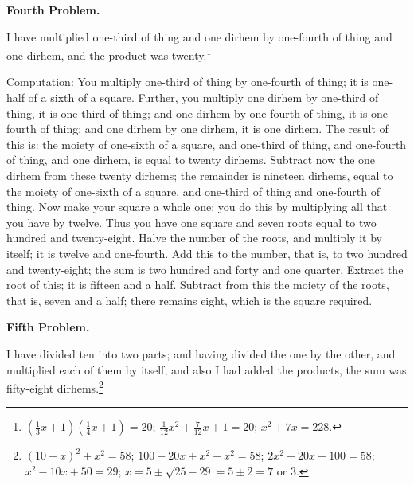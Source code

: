 \vspace{0.3cm}
\noindent\textbf{Fourth Problem.}

I have multiplied one-third of thing and one dirhem by one-fourth of thing and one dirhem, and the product was twenty.\footnote{$(\frac{1}{3}x + 1)(\frac{1}{4}x + 1) = 20$; $\frac{1}{12}x^2 + \frac{7}{12}x + 1 = 20$; $x^2 + 7x = 228$.}

Computation: You multiply one-third of thing by one-fourth of thing; it is one-half of a sixth of a square. Further, you multiply one dirhem by one-third of thing, it is one-third of thing; and one dirhem by one-fourth of thing, it is one-fourth of thing; and one dirhem by one dirhem, it is one dirhem. The result of this is: the moiety of one-sixth of a square, and one-third of thing, and one-fourth of thing, and one dirhem, is equal to twenty dirhems. Subtract now the one dirhem from these twenty dirhems; the remainder is nineteen dirhems, equal to the moiety of one-sixth of a square, and one-third of thing and one-fourth of thing. Now make your square a whole one: you do this by multiplying all that you have by twelve. Thus you have one square and seven roots equal to two hundred and twenty-eight. Halve the number of the roots, and multiply it by itself; it is twelve and one-fourth. Add this to the number, that is, to two hundred and twenty-eight; the sum is two hundred and forty and one quarter. Extract the root of this; it is fifteen and a half. Subtract from this the moiety of the roots, that is, seven and a half; there remains eight, which is the square required.

\vspace{0.3cm}
\noindent\textbf{Fifth Problem.}

I have divided ten into two parts; and having divided the one by the other, and multiplied each of them by itself, and also I had added the products, the sum was fifty-eight dirhems.\footnote{$(10-x)^2 + x^2 = 58$; $100 - 20x + x^2 + x^2 = 58$; $2x^2 - 20x + 100 = 58$; $x^2 - 10x + 50 = 29$; $x = 5 \pm \sqrt{25-29} = 5 \pm 2 = 7$ or $3$.}

